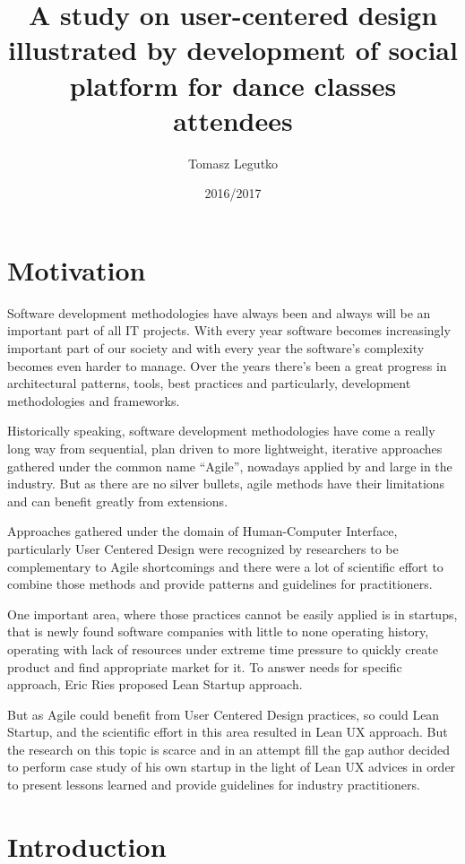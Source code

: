 \documentclass{article}
\title{A study on user-centered design illustrated by development of social platform for dance classes attendees}
\author{Tomasz Legutko}
\date{2016/2017}
\begin{document}
\maketitle
\tableofcontents
\section{Motivation}
Software development methodologies have always been and always will be an important part of all IT projects. With every year software becomes increasingly important part of our society and with every year the software's complexity becomes even harder to manage. Over the years there's been a great progress in architectural patterns, tools, best practices and particularly, development methodologies and frameworks.

Historically speaking, software development methodologies have come a really long way from sequential, plan driven to more lightweight, iterative approaches gathered under the common name ``Agile'', nowadays applied by and large in the industry. But as there are no silver bullets, agile methods have their limitations and can benefit greatly from extensions.

Approaches gathered under the domain of Human-Computer Interface, particularly User Centered Design were recognized by researchers to be complementary to Agile shortcomings and there were a lot of scientific effort to combine those methods and provide patterns and guidelines for practitioners. 

One important area, where those practices cannot be easily applied is in startups, that is newly found software companies with little to none operating history, operating with lack of resources under extreme time pressure to quickly create product and find appropriate market for it. To answer needs for specific approach, Eric Ries proposed Lean Startup approach.

But as Agile could benefit from User Centered Design practices, so could Lean Startup, and the scientific effort in this area resulted in Lean UX approach. But the research on this topic is scarce and in an attempt fill the gap author decided to perform case study of his own startup in the light of Lean UX advices in order to present lessons learned and provide guidelines for industry practitioners.

\section{Introduction}
\end{document}
